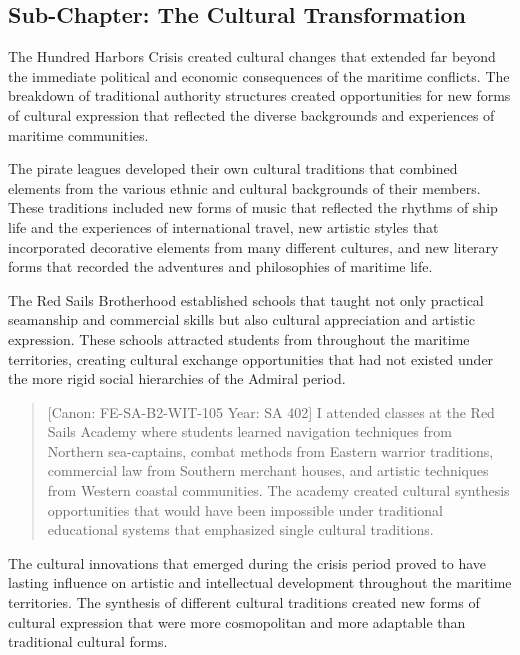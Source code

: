 \subsection{Sub-Chapter: The Cultural
Transformation}\label{sub-chapter-the-cultural-transformation}

The Hundred Harbors Crisis created cultural changes that extended far
beyond the immediate political and economic consequences of the maritime
conflicts. The breakdown of traditional authority structures created
opportunities for new forms of cultural expression that reflected the
diverse backgrounds and experiences of maritime communities.

The pirate leagues developed their own cultural traditions that combined
elements from the various ethnic and cultural backgrounds of their
members. These traditions included new forms of music that reflected the
rhythms of ship life and the experiences of international travel, new
artistic styles that incorporated decorative elements from many
different cultures, and new literary forms that recorded the adventures
and philosophies of maritime life.

The Red Sails Brotherhood established schools that taught not only
practical seamanship and commercial skills but also cultural
appreciation and artistic expression. These schools attracted students
from throughout the maritime territories, creating cultural exchange
opportunities that had not existed under the more rigid social
hierarchies of the Admiral period.

\begin{quote}
{[}Canon: FE-SA-B2-WIT-105 \textbar{} Year: SA 402{]} I attended classes
at the Red Sails Academy where students learned navigation techniques
from Northern sea-captains, combat methods from Eastern warrior
traditions, commercial law from Southern merchant houses, and artistic
techniques from Western coastal communities. The academy created
cultural synthesis opportunities that would have been impossible under
traditional educational systems that emphasized single cultural
traditions.
\end{quote}

The cultural innovations that emerged during the crisis period proved to
have lasting influence on artistic and intellectual development
throughout the maritime territories. The synthesis of different cultural
traditions created new forms of cultural expression that were more
cosmopolitan and more adaptable than traditional cultural forms.

